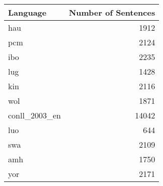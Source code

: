 \begin{tabular}{lr}
\toprule
     Language &  Number of Sentences \\
\midrule
          hau &                 1912 \\
          pcm &                 2124 \\
          ibo &                 2235 \\
          lug &                 1428 \\
          kin &                 2116 \\
          wol &                 1871 \\
conll\_2003\_en &                14042 \\
          luo &                  644 \\
          swa &                 2109 \\
          amh &                 1750 \\
          yor &                 2171 \\
\bottomrule
\end{tabular}
